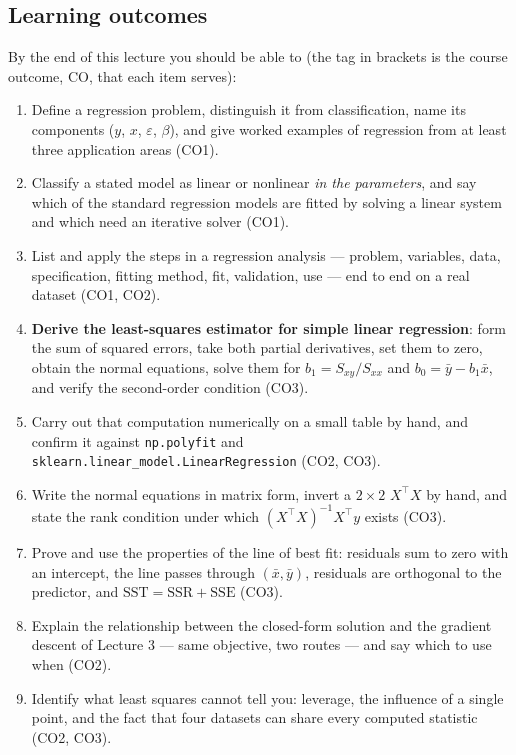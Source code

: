 \documentclass[11pt]{article}
\begin{document}
\subsection{Learning outcomes}

By the end of this lecture you should be able to (the tag in brackets is the
course outcome, CO, that each item serves):

\begin{enumerate}[leftmargin=*]
  \item Define a regression problem, distinguish it from classification, name
    its components ($y$, $x$, $\varepsilon$, $\beta$), and give worked
    examples of regression from at least three application areas (CO1).
  \item Classify a stated model as linear or nonlinear \emph{in the
    parameters}, and say which of the standard regression models are fitted
    by solving a linear system and which need an iterative solver (CO1).
  \item List and apply the steps in a regression analysis --- problem,
    variables, data, specification, fitting method, fit, validation, use ---
    end to end on a real dataset (CO1, CO2).
  \item \textbf{Derive the least-squares estimator for simple linear
    regression}: form the sum of squared errors, take both partial
    derivatives, set them to zero, obtain the normal equations, solve them for
    $b_1 = S_{xy}/S_{xx}$ and $b_0 = \bar y - b_1\bar x$, and verify the
    second-order condition (CO3).
  \item Carry out that computation numerically on a small table by hand, and
    confirm it against \texttt{np.polyfit} and
    \texttt{sklearn.linear\_model.LinearRegression} (CO2, CO3).
  \item Write the normal equations in matrix form, invert a $2\times2$
    $X^{\!\top}\!X$ by hand, and state the rank condition under which
    $(X^{\!\top}\!X)^{-1}X^{\!\top}y$ exists (CO3).
  \item Prove and use the properties of the line of best fit: residuals sum to
    zero with an intercept, the line passes through $(\bar x,\bar y)$,
    residuals are orthogonal to the predictor, and
    $\mathrm{SST} = \mathrm{SSR} + \mathrm{SSE}$ (CO3).
  \item Explain the relationship between the closed-form solution and the
    gradient descent of Lecture 3 --- same objective, two routes --- and say
    which to use when (CO2).
  \item Identify what least squares cannot tell you: leverage, the influence
    of a single point, and the fact that four datasets can share every
    computed statistic (CO2, CO3).
\end{enumerate}
\end{document}
